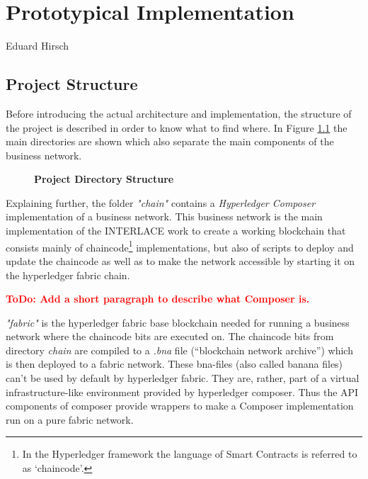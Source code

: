 \chapter{Prototypical Implementation}
\label{ch:prototype}

\vspace{-1cm}
\begin{center}
Eduard Hirsch
\end{center}

\section{Project Structure}
\label{sec:project-structure}

Before introducing the actual architecture and implementation, the structure of the project is described in order to know what to find where. In Figure \ref{fig:directory-structure} the main directories are shown which also separate the main components of the business network.

\begin{figure}[htbp]
\centering
\begin{minipage}{5cm}
\end{minipage}
\caption{\bf\small Project Directory Structure}
\label{fig:directory-structure}
\end{figure}

Explaining further, the folder \textit{"chain"} contains a \textit{Hyperledger Composer} implementation of a business network. This business network is the main implementation of the INTERLACE work to create a working blockchain that consists mainly of chaincode\footnote{In the Hyperledger framework the language of Smart Contracts is referred to as `chaincode'.} implementations, but also of scripts to deploy and update the chaincode as well as to make the network accessible by starting it on the hyperledger fabric chain.

\textcolor{red}{\bf ToDo: Add a short paragraph to describe what Composer is.}

\textit{"fabric"} is the hyperledger fabric base blockchain needed for running a business network where the chaincode bits are executed on. The chaincode bits from directory \textit{chain} are compiled to a \textit{.bna} file (``blockchain network archive'') which is then deployed to a fabric network. These bna-files (also called banana files) can't be used by default by hyperledger fabric. They are, rather, part of a virtual infrastructure-like environment provided by hyperledger composer. Thus the API components of composer provide wrappers to make a Composer implementation run on a pure fabric network.

